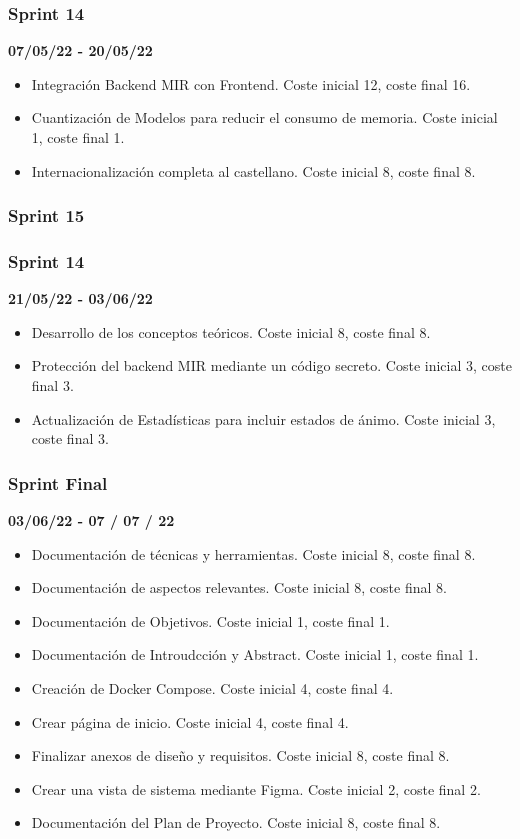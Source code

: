 \subsubsection{Sprint 14}
\textbf{07/05/22 - 20/05/22}
\begin{itemize}
    \item Integración Backend MIR con Frontend. Coste inicial 12, coste final 16.
    \item Cuantización de Modelos para reducir el consumo de memoria. Coste inicial 1, coste final 1.
    \item Internacionalización completa al castellano. Coste inicial 8, coste final 8. 
\end{itemize}


\subsubsection{Sprint 15}
\subsubsection{Sprint 14}
\textbf{21/05/22 - 03/06/22}
\begin{itemize}
    \item Desarrollo de los conceptos teóricos. Coste inicial 8, coste final 8.
    \item Protección del backend MIR mediante un código secreto. Coste inicial 3, coste final 3.
    \item Actualización de Estadísticas para incluir estados de ánimo. Coste inicial 3, coste final 3.
\end{itemize}


\subsubsection{Sprint Final}
\textbf{03/06/22 - 07 / 07 / 22}
\begin{itemize}
    \item Documentación de técnicas y herramientas. Coste inicial 8, coste final 8.
    \item Documentación de aspectos relevantes. Coste inicial 8, coste final 8.
    \item Documentación de Objetivos. Coste inicial 1, coste final 1.
    \item Documentación de Introudcción y Abstract. Coste inicial 1, coste final 1.
    \item Creación de Docker Compose. Coste inicial 4, coste final 4.
    \item Crear página de inicio. Coste inicial 4, coste final 4.
    \item Finalizar anexos de diseño y requisitos. Coste inicial 8, coste final 8.
    \item Crear una vista de sistema mediante Figma. Coste inicial 2, coste final 2.
    \item Documentación del Plan de Proyecto. Coste inicial 8, coste final 8.
\end{itemize}



